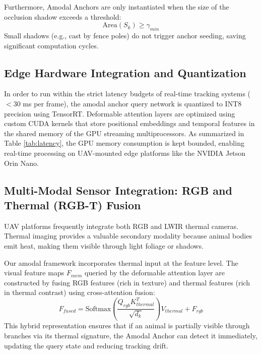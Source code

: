 \documentclass[10pt,conference,letterpaper,twocolumn]{article}
\begin{document}
Furthermore, Amodal Anchors are only instantiated when the size of the occlusion shadow exceeds a threshold:
\begin{equation}
\text{Area}(S_k) \geq \gamma_{min}
\end{equation}
Small shadows (e.g., cast by fence poles) do not trigger anchor seeding, saving significant computation cycles.

\subsection{Edge Hardware Integration and Quantization}
In order to run within the strict latency budgets of real-time tracking systems ($<30$ ms per frame), the amodal anchor query network is quantized to INT8 precision using TensorRT. Deformable attention layers are optimized using custom CUDA kernels that store positional embeddings and temporal features in the shared memory of the GPU streaming multiprocessors. As summarized in Table \ref{tab:latency}, the GPU memory consumption is kept bounded, enabling real-time processing on UAV-mounted edge platforms like the NVIDIA Jetson Orin Nano.

\subsection{Multi-Modal Sensor Integration: RGB and Thermal (RGB-T) Fusion}
UAV platforms frequently integrate both RGB and LWIR thermal cameras. Thermal imaging provides a valuable secondary modality because animal bodies emit heat, making them visible through light foliage or shadows.

Our amodal framework incorporates thermal input at the feature level. The visual feature maps $F_{mem}$ queried by the deformable attention layer are constructed by fusing RGB features (rich in texture) and thermal features (rich in thermal contrast) using cross-attention fusion:
\begin{equation}
F_{fused} = \text{Softmax}\left(\frac{Q_{rgb} K_{thermal}^T}{\sqrt{d_k}}\right) V_{thermal} + F_{rgb}
\end{equation}
This hybrid representation ensures that if an animal is partially visible through branches via its thermal signature, the Amodal Anchor can detect it immediately, updating the query state and reducing tracking drift.
\end{document}

